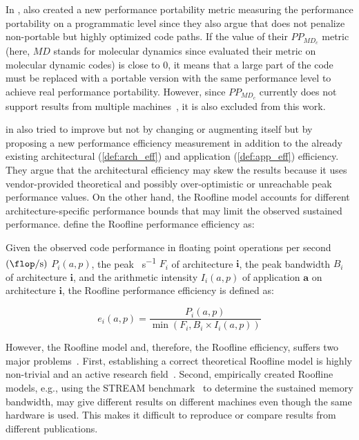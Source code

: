 In \citeyear{sedova_high-performance_2018}, \citet{sedova_high-performance_2018} also created a new performance portability metric measuring the performance portability on a programmatic level since they also argue that \pp does not penalize non-portable but highly optimized code paths. 
If the value of their $PP_{MD_c}$ metric (here, $MD$ stands for molecular dynamics since \citeauthor{sedova_high-performance_2018} evaluated their metric on molecular dynamic codes) is close to $0$, it means that a large part of the code must be replaced with a portable version with the same performance level to achieve real performance portability. 
However, since $PP_{MD_c}$ currently does not support results from multiple machines~\cite{sedova_high-performance_2018}, it is also excluded from this work. 

\citet{yang_empirical_2018} in \citeyear{yang_empirical_2018} also tried to improve \pp but not by changing or augmenting \pp itself but by proposing a new performance efficiency measurement in addition to the already existing architectural (\autoref{def:arch_eff}) and application (\autoref{def:app_eff}) efficiency. 
They argue that the architectural efficiency may skew the results because it uses vendor-provided theoretical and possibly over-optimistic or unreachable peak performance values. 
On the other hand, the Roofline model accounts for different architecture-specific performance bounds that may limit the observed sustained performance. 
\citeauthor{yang_empirical_2018} define the Roofline performance efficiency as: 
\begin{definition}\label{def:roof_eff}
Given the observed code performance in floating point operations per second $\left(\si{\flop\per\second}\right)$ $P_i(a, p)$, the peak \si{\flop\per\second} $F_i$ of architecture $\mathbf{i}$, the peak bandwidth $B_i$ of architecture $\mathbf{i}$, and the arithmetic intensity $I_i(a, p)$ of application $\mathbf{a}$ on architecture $\mathbf{i}$, the Roofline performance efficiency is defined as:

$$e_i(a, p) = \frac{P_i(a, p)}{\min(F_i, B_i \times I_i(a, p))}$$
\end{definition}
However, the Roofline model and, therefore, the Roofline efficiency, suffers two major problems~\cite{bertoni_performance_2020, marowka_reformulation_2022}. 
First, establishing a correct theoretical Roofline model is highly non-trivial and an active research field~\cite{williams_roofline_2009, ilic_cache-aware_2014, yokota_novel_2018, taufer_applying_2016, hsu_performance_2018, grete_k-athena_2021, naraparaju_shifting_2024, antepara_performance_2024}. 
Second, empirically created Roofline models, e.g., using the STREAM benchmark~\cite{mccalpin_memory_1995} to determine the sustained memory bandwidth, may give different results on different machines even though the same hardware is used. 
This makes it difficult to reproduce or compare results from different publications. 

